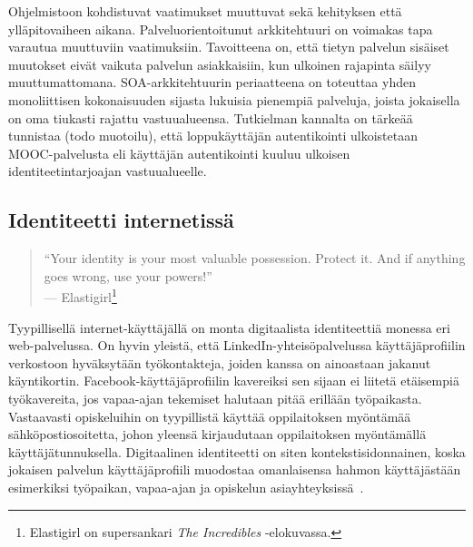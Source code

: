 \documentclass[finnish,gradu]{tktltiki}
\begin{document}
  Ohjelmistoon kohdistuvat vaatimukset muuttuvat sekä kehityksen että ylläpitovaiheen aikana. Palveluorientoitunut arkkitehtuuri on voimakas tapa varautua muuttuviin vaatimuksiin. Tavoitteena on, että tietyn palvelun sisäiset muutokset eivät vaikuta palvelun asiakkaisiin, kun ulkoinen rajapinta säilyy muuttumattomana. SOA-arkkitehtuurin periaatteena on toteuttaa yhden monoliittisen kokonaisuuden sijasta lukuisia pienempiä palveluja, joista jokaisella on oma tiukasti rajattu vastuualueensa. Tutkielman kannalta on tärkeää tunnistaa (todo muotoilu), että loppukäyttäjän autentikointi ulkoistetaan MOOC-palvelusta eli käyttäjän autentikointi kuuluu ulkoisen identiteetintarjoajan vastuualueelle.





  \subsection{Identiteetti internetissä} %
  \label{sub:identiteetti_internetissä}

  \begin{quote}
    ``Your identity is your most valuable possession. Protect it.
    And if anything goes wrong, use your powers!''
    \\--- Elastigirl\footnote{
      Elastigirl on supersankari \emph{The Incredibles} -elokuvassa.
    }
  \end{quote}

  Tyypillisellä internet-käyttäjällä on monta digitaalista identiteettiä monessa eri web-palvelussa. On hyvin yleistä, että LinkedIn-yhteisöpalvelussa käyttäjäprofiilin verkostoon hyväksytään työkontakteja, joiden kanssa on ainoastaan jakanut käyntikortin. Facebook-käyttäjäprofiilin kavereiksi sen sijaan ei liitetä etäisempiä työkavereita, jos vapaa-ajan tekemiset halutaan pitää erillään työpaikasta. Vastaavasti opiskeluihin on tyypillistä käyttää oppilaitoksen myöntämää sähköpostiosoitetta, johon yleensä kirjaudutaan oppilaitoksen myöntämällä käyttäjätunnuksella. Digitaalinen identiteetti on siten kontekstisidonnainen, koska jokaisen palvelun käyttäjäprofiili muodostaa omanlaisensa hahmon käyttäjästään esimerkiksi työpaikan, vapaa-ajan ja opiskelun asiayhteyksissä~\cite{idwoman_identity_gplus_2011, guardianblog_gplus_id_2011}.
\end{document}
